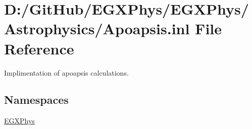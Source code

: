 \hypertarget{_apoapsis_8inl}{}\section{D\+:/\+Git\+Hub/\+E\+G\+X\+Phys/\+E\+G\+X\+Phys/\+Astrophysics/\+Apoapsis.inl File Reference}
\label{_apoapsis_8inl}


Implimentation of apoapsis calculations.  


\subsection*{Namespaces}
\begin{DoxyCompactItemize}
\item 
 \mbox{\hyperlink{namespace_e_g_x_phys}{E\+G\+X\+Phys}}
\end{DoxyCompactItemize}

